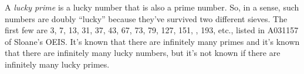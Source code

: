 \documentclass[12pt]{article}
\begin{document}
A {\em lucky prime} is a lucky number that is also a prime number. So, in a sense, such numbers are doubly ``lucky'' because they've survived two different sieves. The first few are 3, 7, 13, 31, 37, 43, 67, 73, 79, 127, 151, , 193, etc., listed in A031157 of Sloane's OEIS. It's known that there are infinitely many primes and it's known that there are infinitely many lucky numbers, but it's not known if there are infinitely many lucky primes.
\end{document}
